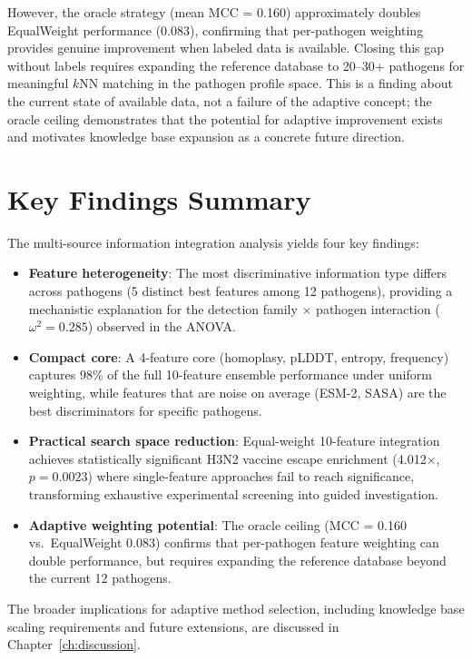 However, the oracle strategy (mean MCC = 0.160) approximately doubles EqualWeight performance (0.083), confirming that per-pathogen weighting provides genuine improvement when labeled data is available.
Closing this gap without labels requires expanding the reference database to 20--30+ pathogens for meaningful $k$NN matching in the pathogen profile space.
This is a finding about the current state of available data, not a failure of the adaptive concept; the oracle ceiling demonstrates that the potential for adaptive improvement exists and motivates knowledge base expansion as a concrete future direction.

\section{Key Findings Summary}
\label{sec:adapt_summary}

The multi-source information integration analysis yields four key findings:

\begin{itemize}
\item \textbf{Feature heterogeneity}: The most discriminative information type differs across pathogens (5 distinct best features among 12 pathogens), providing a mechanistic explanation for the detection family $\times$ pathogen interaction ($\omega^2 = 0.285$) observed in the ANOVA.
\item \textbf{Compact core}: A 4-feature core (homoplasy, pLDDT, entropy, frequency) captures 98\% of the full 10-feature ensemble performance under uniform weighting, while features that are noise on average (ESM-2, SASA) are the best discriminators for specific pathogens.
\item \textbf{Practical search space reduction}: Equal-weight 10-feature integration achieves statistically significant H3N2 vaccine escape enrichment (4.012$\times$, $p = 0.0023$) where single-feature approaches fail to reach significance, transforming exhaustive experimental screening into guided investigation.
\item \textbf{Adaptive weighting potential}: The oracle ceiling (MCC = 0.160 vs.\ EqualWeight 0.083) confirms that per-pathogen feature weighting can double performance, but requires expanding the reference database beyond the current 12 pathogens.
\end{itemize}

The broader implications for adaptive method selection, including knowledge base scaling requirements and future extensions, are discussed in Chapter~\ref{ch:discussion}.
